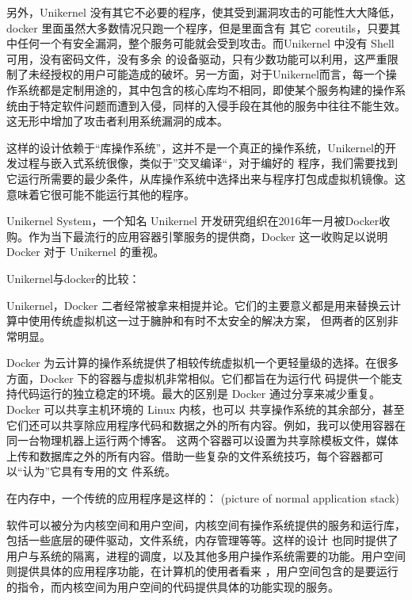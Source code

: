 \documentclass[fontsize=13pt, %
    paper=a4, %
    twoside, %
    captions=tableheading,
    index=totoc,
    hyperref]{labbook}
\begin{document}
\begin{spacing}{1.0}
\begin{addmargin}[4cm]{0cm}
另外，Unikernel 没有其它不必要的程序，使其受到漏洞攻击的可能性大大降低，docker 里面虽然大多数情况只跑一个程序，但是里面含有
其它 coreutils，只要其中任何一个有安全漏洞，整个服务可能就会受到攻击。而Unikernel 中没有 Shell 可用，没有密码文件，没有多余
的设备驱动，只有少数功能可以利用，这严重限制了未经授权的用户可能造成的破坏。另一方面，对于Unikernel而言，每一个操作系统都是定制用途的，其中包含的核心库均不相同，即使某个服务构建的操作系统由于特定软件问题而遭到入侵，同样的入侵手段在其他的服务中往往不能生效。这无形中增加了攻击者利用系统漏洞的成本。

这样的设计依赖于“库操作系统”，这并不是一个真正的操作系统，Unikernel的开发过程与嵌入式系统很像，类似于”交叉编译“，对于编好的
程序，我们需要找到它运行所需要的最少条件，从库操作系统中选择出来与程序打包成虚拟机镜像。这意味着它很可能不能运行其他的程序。

Unikernel System，一个知名 Unikernel 开发研究组织在2016年一月被Docker收购。作为当下最流行的应用容器引擎服务的提供商，Docker 
这一收购足以说明 Docker 对于 Unikernel 的重视。

Unikernel与docker的比较：

Unikernel，Docker 二者经常被拿来相提并论。它们的主要意义都是用来替换云计算中使用传统虚拟机这一过于臃肿和有时不太安全的解决方案，
但两者的区别非常明显。

Docker 为云计算的操作系统提供了相较传统虚拟机一个更轻量级的选择。在很多方面，Docker 下的容器与虚拟机非常相似。它们都旨在为运行代
码提供一个能支持代码运行的独立稳定的环境。最大的区别是 Docker 通过分享来减少重复。Docker 可以共享主机环境的 Linux 内核，也可以
共享操作系统的其余部分，甚至它们还可以共享除应用程序代码和数据之外的所有内容。例如，我可以使用容器在同一台物理机器上运行两个博客。
这两个容器可以设置为共享除模板文件，媒体上传和数据库之外的所有内容。借助一些复杂的文件系统技巧，每个容器都可以“认为”它具有专用的文
件系统。




在内存中，一个传统的应用程序是这样的：
(picture of normal application stack)

软件可以被分为内核空间和用户空间，内核空间有操作系统提供的服务和运行库，包括一些底层的硬件驱动，文件系统，内存管理等等。这样的设计
也同时提供了用户与系统的隔离，进程的调度，以及其他多用户操作系统需要的功能。用户空间则提供具体的应用程序功能，在计算机的使用者看来
，用户空间包含的是要运行的指令，而内核空间为用户空间的代码提供具体的功能实现的服务。


\end{addmargin}
\end{spacing}
\end{document}
